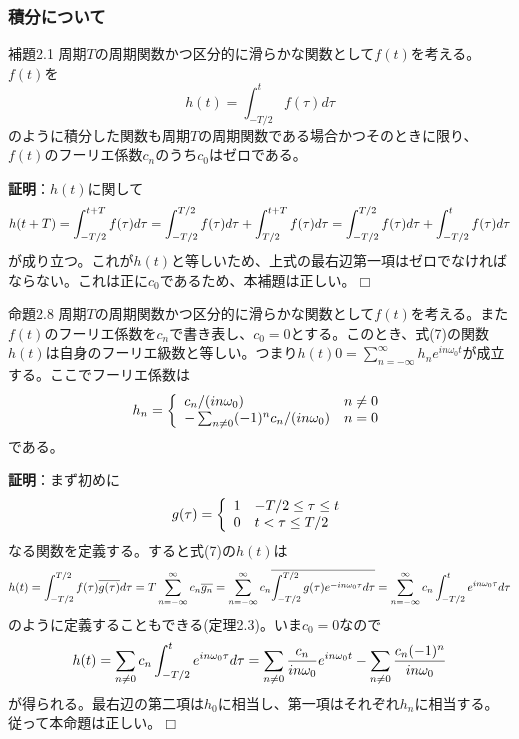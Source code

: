 \documentclass[dvipdfmx, 9pt, a4paper]{jsarticle}
\def\qed{\hfill $\Box$}
\begin{document}
\subsubsection{積分について}
\begin{itembox}[l]{補題2.1}
周期$T$の周期関数かつ区分的に滑らかな関数として$f(t)$を考える。$f(t)$を
\begin{equation}
h(t)=\int_{-T/2}^tf(\tau)d\tau
\end{equation}
のように積分した関数も周期$T$の周期関数である場合かつそのときに限り、$f(t)$のフーリエ係数$c_n$のうち$c_0$はゼロである。
\end{itembox}
{\bf 証明}：$h(t)$に関して
\begin{equation}
h(t+T)=\int_{-T/2}^{t+T}f(\tau)d\tau=\int_{-T/2}^{T/2}f(\tau)d\tau+\int_{T/2}^{t+T}f(\tau)d\tau=\int_{-T/2}^{T/2}f(\tau)d\tau+\int_{-T/2}^tf(\tau)d\tau \notag
\end{equation}
が成り立つ。これが$h(t)$と等しいため、上式の最右辺第一項はゼロでなければならない。これは正に$c_0$であるため、本補題は正しい。\qed
\begin{itembox}[l]{命題2.8}
周期$T$の周期関数かつ区分的に滑らかな関数として$f(t)$を考える。また$f(t)$のフーリエ係数を$c_n$で書き表し、$c_0=0$とする。このとき、式(7)の関数$h(t)$は自身のフーリエ級数と等しい。つまり$h(t)0=\sum_{n=-\infty}^\infty h_ne^{in\omega_0t}$が成立する。ここでフーリエ係数は
\begin{equation}
h_n=
\left\{
\begin{array}{ll}
c_n/(in\omega_0) & n \neq 0 \\
-\sum_{n \neq 0}(-1)^nc_n/(in\omega_0) & n=0
\end{array}
\right. \notag
\end{equation}
である。　
\end{itembox}
{\bf 証明}：まず初めに
\begin{equation}
g(\tau)=
\left\{
\begin{array}{ll}
1 & -T/2 \leq \tau \leq t \\
0 & t < \tau \leq T/2
\end{array}\right. \notag
\end{equation}
なる関数を定義する。すると式(7)の$h(t)$は
\begin{equation}
h(t)=\int_{-T/2}^{T/2}f(\tau)\overline{g(\tau)}d\tau=T\sum_{n=-\infty}^\infty c_n\overline{g_n}=\sum_{n=-\infty}^\infty c_n \overline{\int_{-T/2}^{T/2}g(\tau)e^{-in\omega_0\tau}d\tau}=\sum_{n=-\infty}^\infty c_n\int_{-T/2}^te^{in\omega_0\tau}d\tau \notag
\end{equation}
のように定義することもできる(定理2.3)。いま$c_0=0$なので
\begin{equation}
h(t)=\sum_{n \neq 0}c_n\int_{-T/2}^te^{in\omega_0\tau}d\tau=\sum_{n \neq 0}\frac{c_n}{in\omega_0}e^{in\omega_0t}-\sum_{n \neq 0} \frac{c_n(-1)^n}{in\omega_0} \notag
\end{equation}
が得られる。最右辺の第二項は$h_0$に相当し、第一項はそれぞれ$h_n$に相当する。従って本命題は正しい。\qed
\end{document}
